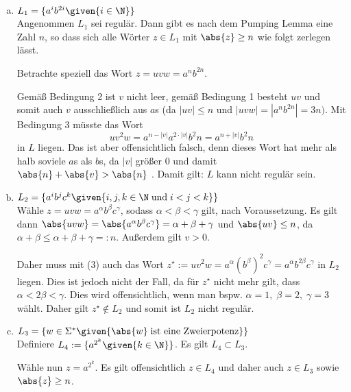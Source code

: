   \begin{enumerate}[a)]
  \item $ L_1 = \{ a^i b^{2i} \given{i \in \N} \} $ \\

    Angenommen $L_1$ sei regulär. Dann gibt es nach dem Pumping Lemma eine Zahl $n$, so dass sich alle Wörter $ z \in L_1 $ mit $ \abs{z} \geq n $ wie folgt zerlegen lässt.

    Betrachte speziell das Wort $z = uvw = a^n b^{2n}$.

    Gemäß Bedingung 2 ist $v$ nicht leer, gemäß Bedingung 1 besteht $uv$ und somit auch $v$ ausschließlich aus $a$s (da $\left|uv\right| \leq n$ und $\left|uvw\right| = \left|a^n b^{2n}\right| = 3n)$. Mit Bedingung 3 müsste das Wort
    \[ uv^2w = a^{n - \left|v\right|} a^{2 \cdot \left|v\right|}b^2n = a^{n+ \left|v\right|}b^2n \]
    in $L$ liegen. Das ist aber offensichtlich falsch, denn dieses Wort hat mehr als halb soviele $a$s als $b$s, da  ${\left|v\right|}$ größer 0 und damit $\abs{n} + \abs{v} > \abs{n}$ . Damit gilt: $L$ kann nicht regulär sein. \\

  \item $ L_2 = \{  a^{i} b^{j} c^{k} \given {i,j,k \in \N \; \text{und} \; i < j < k}  \} $ \\

    Wähle $z = uvw = a^{\alpha} b^{\beta} c^{\gamma}$, sodass $\alpha < \beta < \gamma$ gilt, nach Voraussetzung. Es gilt dann $\abs{uvw} = \abs{ a^{\alpha} b^{\beta} c^{\gamma} } = \alpha + \beta + \gamma $ und $\abs{uv} \leq n$, da $\alpha + \beta \leq \alpha + \beta + \gamma =: n$. Außerdem gilt $v > 0$.

    Daher muss mit (3) auch das Wort $z^{\star} := uv^2 w = a^{\alpha} (b^{\beta})^2 c^{\gamma} = a^{\alpha} b^{2 \beta} c^{\gamma}$ in $L_2$ liegen. Dies ist jedoch nicht der Fall, da für $z^{\star}$ nicht mehr gilt, dass $\alpha < 2 \beta < \gamma$. Dies wird offensichtlich, wenn man bspw. $\alpha = 1, \; \beta = 2, \; \gamma = 3$ wählt. Daher gilt $z^{\star} \notin L_2$ und somit ist $L_2$ nicht regulär.\\

  \item $ L_3 = \{  w \in \Sigma^{*} \given{ \abs{w} \; \text{ist eine Zweierpotenz} }  \} $ \\

  Definiere $L_4 := \{  a^{2^{k}} \given{k \in \N}  \}$. Es gilt $L_4 \subset L_3$.

  Wähle nun $z = a^{2^{k}}$. Es gilt offensichtlich $z \in L_4$ und daher auch $z \in L_3$ sowie $\abs{z} \geq n$.


\end{enumerate}
